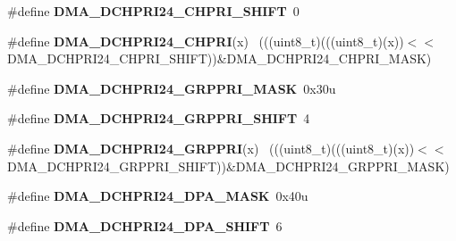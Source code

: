 \begin{DoxyCompactItemize}
\item 
\hypertarget{group___d_m_a___register___masks_ga05466c1c585e76ce5a394d94e5300853}{}\#define {\bfseries D\+M\+A\+\_\+\+D\+C\+H\+P\+R\+I24\+\_\+\+C\+H\+P\+R\+I\+\_\+\+S\+H\+I\+F\+T}~0\label{group___d_m_a___register___masks_ga05466c1c585e76ce5a394d94e5300853}

\item 
\hypertarget{group___d_m_a___register___masks_ga65c2a2f502889d53c1caabefe123c4f0}{}\#define {\bfseries D\+M\+A\+\_\+\+D\+C\+H\+P\+R\+I24\+\_\+\+C\+H\+P\+R\+I}(x)                                    ~(((uint8\+\_\+t)(((uint8\+\_\+t)(x))$<$$<$D\+M\+A\+\_\+\+D\+C\+H\+P\+R\+I24\+\_\+\+C\+H\+P\+R\+I\+\_\+\+S\+H\+I\+F\+T))\&D\+M\+A\+\_\+\+D\+C\+H\+P\+R\+I24\+\_\+\+C\+H\+P\+R\+I\+\_\+\+M\+A\+S\+K)\label{group___d_m_a___register___masks_ga65c2a2f502889d53c1caabefe123c4f0}

\item 
\hypertarget{group___d_m_a___register___masks_ga3d99faadacb7a29b60cb0084eccc0214}{}\#define {\bfseries D\+M\+A\+\_\+\+D\+C\+H\+P\+R\+I24\+\_\+\+G\+R\+P\+P\+R\+I\+\_\+\+M\+A\+S\+K}~0x30u\label{group___d_m_a___register___masks_ga3d99faadacb7a29b60cb0084eccc0214}

\item 
\hypertarget{group___d_m_a___register___masks_gae0100a46e1bc805b4bda82d019824420}{}\#define {\bfseries D\+M\+A\+\_\+\+D\+C\+H\+P\+R\+I24\+\_\+\+G\+R\+P\+P\+R\+I\+\_\+\+S\+H\+I\+F\+T}~4\label{group___d_m_a___register___masks_gae0100a46e1bc805b4bda82d019824420}

\item 
\hypertarget{group___d_m_a___register___masks_ga0f3cee87b244524027a02b9d905233f2}{}\#define {\bfseries D\+M\+A\+\_\+\+D\+C\+H\+P\+R\+I24\+\_\+\+G\+R\+P\+P\+R\+I}(x)                                  ~(((uint8\+\_\+t)(((uint8\+\_\+t)(x))$<$$<$D\+M\+A\+\_\+\+D\+C\+H\+P\+R\+I24\+\_\+\+G\+R\+P\+P\+R\+I\+\_\+\+S\+H\+I\+F\+T))\&D\+M\+A\+\_\+\+D\+C\+H\+P\+R\+I24\+\_\+\+G\+R\+P\+P\+R\+I\+\_\+\+M\+A\+S\+K)\label{group___d_m_a___register___masks_ga0f3cee87b244524027a02b9d905233f2}

\item 
\hypertarget{group___d_m_a___register___masks_gaa633bc01ad2fd770ea7592a5e2543e59}{}\#define {\bfseries D\+M\+A\+\_\+\+D\+C\+H\+P\+R\+I24\+\_\+\+D\+P\+A\+\_\+\+M\+A\+S\+K}~0x40u\label{group___d_m_a___register___masks_gaa633bc01ad2fd770ea7592a5e2543e59}

\item 
\hypertarget{group___d_m_a___register___masks_ga97fd206df393e8dcead66d5e045d2f15}{}\#define {\bfseries D\+M\+A\+\_\+\+D\+C\+H\+P\+R\+I24\+\_\+\+D\+P\+A\+\_\+\+S\+H\+I\+F\+T}~6\label{group___d_m_a___register___masks_ga97fd206df393e8dcead66d5e045d2f15}


\end{DoxyCompactItemize}
